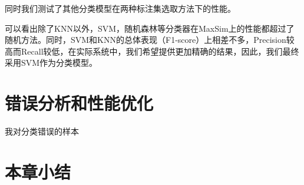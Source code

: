 同时我们测试了其他分类模型在两种标注集选取方法下的性能。

可以看出除了KNN以外，SVM，随机森林等分类器在MaxSim上的性能都超过了随机方法。同时，SVM和KNN的总体表现（F1-score）上相差不多，Precision较高而Recall较低，在实际系统中，我们希望提供更加精确的结果，因此，我们最终采用SVM作为分类模型。

\section{错误分析和性能优化}
我对分类错误的样本

\section{本章小结}

